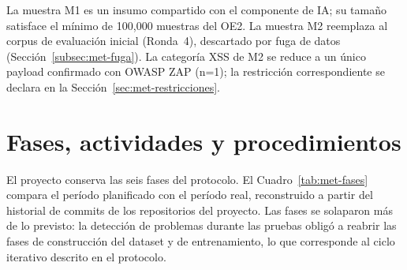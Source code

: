 La muestra M1 es un insumo compartido con el componente de IA; su tamaño satisface el mínimo de
100{,}000 muestras del OE2. La muestra M2 reemplaza al corpus de evaluación inicial (Ronda~4),
descartado por fuga de datos (Sección~\ref{subsec:met-fuga}). La categoría XSS de M2 se reduce a un único payload confirmado con OWASP ZAP (n=1); la restricción
correspondiente se declara en la Sección~\ref{sec:met-restricciones}.

\section{Fases, actividades y procedimientos}
\label{sec:met-fases}

El proyecto conserva las seis fases del protocolo. El Cuadro~\ref{tab:met-fases} compara el
período planificado con el período real, reconstruido a partir del historial de commits de los
repositorios del proyecto. Las fases se solaparon más de lo previsto: la detección de problemas
durante las pruebas obligó a reabrir las fases de construcción del dataset y de entrenamiento,
lo que corresponde al ciclo iterativo descrito en el protocolo.


